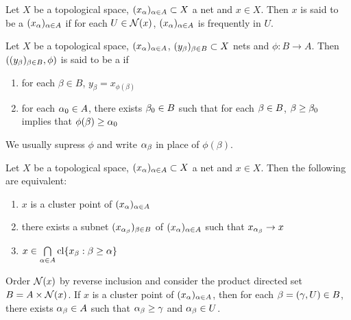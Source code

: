 \documentclass{book}
\begin{document}
	\begin{defn}
		Let $X$ be a topological space, $(x_{\alpha})_{\alpha \in A} \subset X$ a net and $x \in X$. Then $x$ is said to be a  $(x_{\alpha})_{\alpha \in A}$ if for each $U \in \mathcal{N}(x)$, $(x_{\alpha})_{\alpha \in A}$ is frequently in $U$.
	\end{defn}
	
	\begin{defn} \ld{33014}
	Let $X$ be a topological space, $(x_{\alpha})_{\alpha \in A}$, $(y_{\beta})_{\beta \in B} \subset X$ nets and $\phi:B \rightarrow A$. 
	Then $((y_{\beta})_{\beta \in B}, \phi)$ is said to be a  if 
	\begin{enumerate}
		\item for each $\beta \in B$, $y_{\beta} = x_{\phi(\beta)}$
		\item for each $\alpha_0 \in A$, there exists $\beta_0 \in B$ such that for each $\beta \in B$, $\beta \geq \beta_0$ implies that $\phi(\beta) \geq \alpha_0$
	\end{enumerate}
	\end{defn}
	
	\begin{note}
		We usually supress $\phi$ and write $\alpha_{\beta}$ in place of ${\phi(\beta)}$.
	\end{note}
	
	\begin{ex} 
	Let $X$ be a topological space, $(x_{\alpha})_{\alpha \in A} \subset X$ a net and $x \in X$. Then the following are equivalent: 
	\begin{enumerate}
		\item $x$ is a cluster point of $(x_{\alpha})_{\alpha \in A}$
		\item there exists a subnet $(x_{\alpha_{\beta}})_{\beta \in B}$ of $(x_{\alpha})_{\alpha \in A}$ such that $x_{\alpha_{\beta}} \rightarrow x$
		\item $x \in \bigcap\limits_{\alpha \in A} \operatorname{cl} \{x_{\beta}: \beta \geq \alpha\}$
	\end{enumerate}
	 Order $\mathcal{N}(x)$ by reverse inclusion and consider the product directed set $B = A \times \mathcal{N}(x)$. If $x$ is a cluster point of $(x_{\alpha})_{\alpha \in A}$, then for each $\beta = (\gamma, U) \in B$, there exists $\alpha_{\beta} \in A$ such that $\alpha_{\beta} \geq \gamma$ and $\alpha_{\beta} \in U$. 
	\end{ex}
\end{document}

